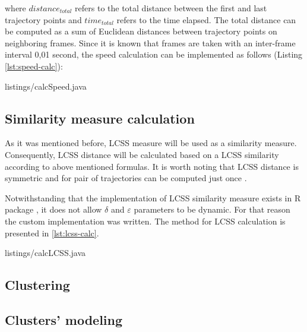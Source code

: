 where $distance_{total}$ refers to the total distance between the first and last trajectory points and $time_{total}$ refers to the time elapsed. The total distance can be computed as a sum of Euclidean distances between trajectory points on neighboring frames. Since it is known that frames are taken with an inter-frame interval 0,01 second, the speed calculation can be implemented as follows (Listing \ref{lst:speed-calc}):

\lstset{style=code-style-java}
 {listings/calcSpeed.java}


\subsection{Similarity measure calculation}

As it was mentioned before, LCSS measure will be used as a similarity measure. Consequently, LCSS distance will be calculated based on a LCSS similarity according to above mentioned formulas. It is worth noting that LCSS distance is symmetric and for pair of trajectories can be computed just once \cite{inproceedings:28_lcss_dsmt}.

Notwithstanding that the implementation of LCSS similarity measure exists in R package \cite{online:r_lcss}, it does not allow $\delta$ and $\varepsilon$ parameters to be dynamic. For that reason the custom implementation was written. The method for LCSS calculation is presented in \ref{lst:lcss-calc}. 

\lstset{style=code-style-java}
 {listings/calcLCSS.java}

\subsection{Clustering}



\subsection{Clusters' modeling}